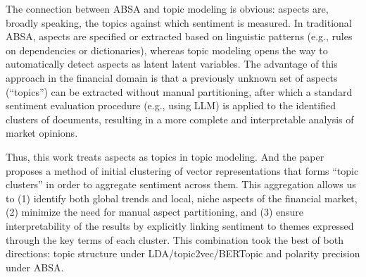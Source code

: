 The connection between ABSA and topic modeling is obvious: aspects are, broadly speaking, the topics against which
sentiment is measured. In traditional ABSA, aspects are specified or extracted based on linguistic patterns (e.g.,
rules on dependencies or dictionaries), whereas topic modeling opens the way to automatically detect aspects as latent
latent variables. The advantage of this approach in the financial domain is that a previously unknown set of aspects
(“topics”) can be extracted without manual partitioning, after which a standard sentiment evaluation procedure (e.g.,
using LLM) is applied to the identified clusters of documents, resulting in a more complete and interpretable analysis
of market opinions.

Thus, this work treats aspects as topics in topic modeling. And the paper proposes a method of initial clustering
of vector representations that forms “topic clusters” in order to aggregate sentiment across them. This aggregation
allows us to (1) identify both global trends and local, niche aspects of the financial market, (2) minimize the need
for manual aspect partitioning, and (3) ensure interpretability of the results by explicitly linking sentiment
to themes expressed through the key terms of each cluster. This combination took the best of both directions: topic
structure under LDA/topic2vec/BERTopic and polarity precision under ABSA.